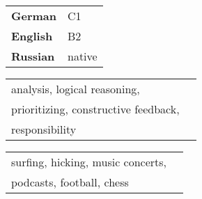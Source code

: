 \begin{minipage}[t]{0.25\textwidth}
  \vspace{-\baselineskip}


  \begin{tabular}{ll}
    \textbf{German}   & C1 \\
    \textbf{English} & B2  \\
    \textbf{Russian}    & native
  \end{tabular}
\end{minipage}
\hfill
\begin{minipage}[t]{0.35\textwidth}
  \vspace{-\baselineskip}


  \begin{tabular}{ll}
    analysis, logical reasoning,\\prioritizing, constructive feedback,\\responsibility
  \end{tabular}
\end{minipage}
\begin{minipage}[t]{0.35\textwidth}
  \vspace{-\baselineskip}

  
  \begin{tabular}{ll}
    surfing, hicking, music concerts,\\podcasts, football, chess
  \end{tabular}
  
\end{minipage}


